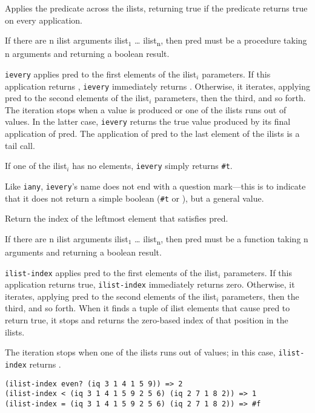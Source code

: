 \begin{entry}{%
  }

  Applies the predicate across the ilists,
  returning true if the predicate returns true on every application.

  If there are n ilist arguments ilist$_1$ \ldots
  ilist\textsubscript{n}, then pred must be a procedure taking n
  arguments and returning a boolean result.

  \texttt{ievery} applies pred to the first elements of the ilist$_i$
  parameters. If this application returns \schfalse{}, \texttt{ievery}
  immediately returns \schfalse{}. Otherwise, it iterates, applying pred to
  the second elements of the ilist$_i$ parameters, then the third, and
  so forth. The iteration stops when a \schfalse{} value is produced or one
  of the ilists runs out of values. In the latter case,
  \texttt{ievery} returns the true value produced by its final
  application of pred. The application of pred to the last element of
  the ilists is a tail call.

  If one of the ilist$_i$ has no elements, \texttt{ievery} simply
  returns \texttt{\#t}.

  Like \texttt{iany}, \texttt{ievery}'s name does not end with a
  question mark---this is to indicate that it does not return a
  simple boolean (\texttt{\#t} or \schfalse{}), but a general value.
\end{entry}

\begin{entry}{%
  } 

  Return the index of the leftmost
  element that satisfies pred.

  If there are n ilist arguments ilist$_1$ \ldots
  ilist\textsubscript{n}, then pred must be a function taking n
  arguments and returning a boolean result.

  \texttt{ilist-index} applies pred to the first elements of the
  ilist$_i$ parameters. If this application returns true,
  \texttt{ilist-index} immediately returns zero. Otherwise, it
  iterates, applying pred to the second elements of the ilist$_i$
  parameters, then the third, and so forth. When it finds a tuple of
  ilist elements that cause pred to return true, it stops and returns
  the zero-based index of that position in the ilists.

  The iteration stops when one of the ilists runs out of values; in
  this case, \texttt{ilist-index} returns \schfalse{}.

\begin{verbatim}
(ilist-index even? (iq 3 1 4 1 5 9)) => 2
(ilist-index < (iq 3 1 4 1 5 9 2 5 6) (iq 2 7 1 8 2)) => 1
(ilist-index = (iq 3 1 4 1 5 9 2 5 6) (iq 2 7 1 8 2)) => #f
\end{verbatim}
\end{entry}

